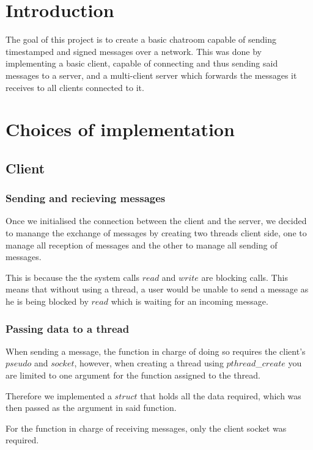 \documentclass[utf8]{article}
\begin{document}
\tableofcontents
\newpage

\section{Introduction}

The goal of this project is to create a basic chatroom capable of sending timestamped and signed messages over a network. This was done by implementing a basic client, capable of connecting and thus sending said messages to a server, and  a multi-client server which forwards the messages it receives to all clients connected to it.

\section{Choices of implementation}

\subsection{Client}

\subsubsection{Sending and recieving messages}
Once we initialised the connection between the client and the server, we decided to manange the exchange of messages by creating two threads client side, one to manage all reception of messages and the other to manage all sending of messages. \par
This is because the the system calls $read$ and $write$ are blocking calls. This means that without using a thread, a user would be unable to send a message as he is being blocked by $read$ which is waiting for an incoming message.

\subsubsection{Passing data to a thread}
When sending a message, the function in charge of doing so requires the client's $pseudo$ and $socket$, however, when creating a thread using $pthread$\_$create$ you are limited to one argument for the function assigned to the thread.\par
Therefore we implemented a $struct$ that holds all the data required, which was then passed as the argument in said function.\par
For the function in charge of receiving messages, only the client socket was required.
\end{document}
